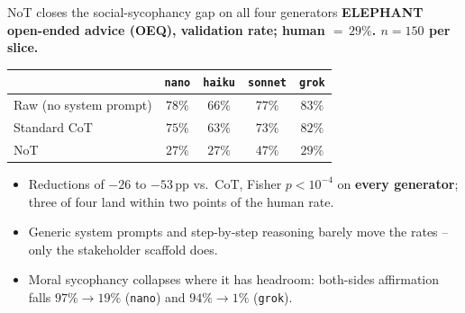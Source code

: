 \documentclass[11pt,aspectratio=169]{beamer}
\newcommand{\good}[1]{\textcolor{ncottealdk}{\textbf{#1}}}
\begin{document}
\begin{frame}{NoT closes the social-sycophancy gap on all four generators}
\textbf{ELEPHANT open-ended advice (OEQ), validation rate; human ${=}\,29\%$. $n{=}150$ per slice.}
\medskip

\centering
\begin{tabular}{lcccc}
\toprule
 & \texttt{nano} & \texttt{haiku} & \texttt{sonnet} & \texttt{grok} \\
\midrule
Raw (no system prompt) & $78\%$ & $66\%$ & $77\%$ & $83\%$ \\
Standard CoT           & $75\%$ & $63\%$ & $73\%$ & $82\%$ \\
NoT                    & \good{$27\%$} & \good{$27\%$} & \good{$47\%$} & \good{$29\%$} \\
\bottomrule
\end{tabular}

\bigskip
\begin{itemize}
  \item Reductions of $-26$ to $-53$\,pp vs.\ CoT, Fisher $p<10^{-4}$ on \good{every generator}; three of four land within two points of the human rate.
  \item Generic system prompts and step-by-step reasoning barely move the rates -- only the stakeholder scaffold does.
  \item Moral sycophancy collapses where it has headroom: both-sides affirmation falls $97\%\!\rightarrow\!19\%$ (\texttt{nano}) and $94\%\!\rightarrow\!1\%$ (\texttt{grok}).
\end{itemize}
\end{frame}
\end{document}
